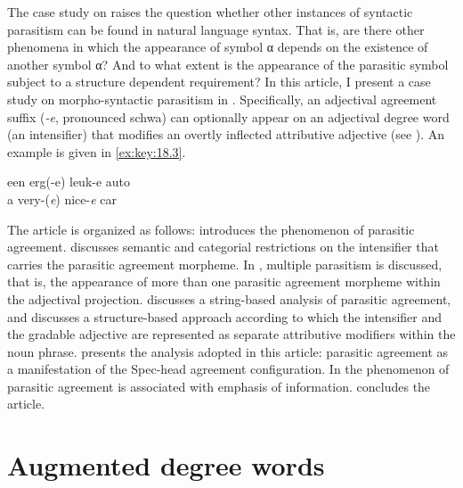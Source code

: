 \documentclass[output=paper]{langsci/langscibook}
\begin{document}
\label{ex:key:18.2}
\z

The case study on  raises the question whether other instances of
syntactic parasitism can be found in natural language syntax. That is, are
there other phenomena in which the appearance of symbol α depends on the
existence of another symbol α? And to what extent is the appearance of the
parasitic symbol subject to a structure dependent requirement? In this article,
I present a case study on morpho-syntactic parasitism in .
Specifically, an adjectival agreement suffix (\emph{-e}, pronounced schwa) can
optionally appear on an adjectival degree word (an intensifier) that modifies
an overtly inflected attributive adjective (see
\citealt{Verdenius1939,Royen1948,Corver1997a}). An example is given in
\eqref{ex:key:18.3}.

\ea%
    \label{ex:key:18.3}
    \sn
    \gll een erg(-e) leuk-e auto\\
         a very-(\emph{e}) nice-\emph{e} car\\
    \glt
\z

The article is organized as follows:  introduces the phenomenon
of parasitic agreement.  discusses semantic and categorial
restrictions on the intensifier that carries the parasitic agreement morpheme.
In , multiple parasitism is discussed, that is, the appearance
of more than one parasitic agreement morpheme within the adjectival projection.
 discusses a string-based analysis of parasitic agreement, and
 discusses a structure-based approach according to which the
intensifier and the gradable adjective are represented as separate attributive
modifiers within the noun phrase.   presents the analysis
adopted in this article: parasitic agreement as a manifestation of the
Spec-head agreement configuration. In  the phenomenon of
parasitic agreement is associated with emphasis of information.
 concludes the article.

\section{Augmented degree words}\label{sec:key:18.2}
\end{document}

